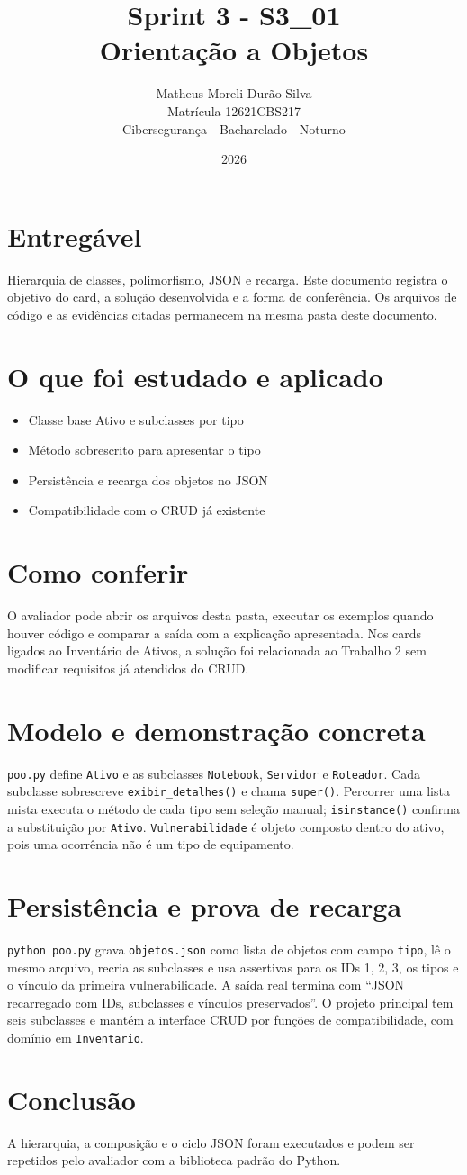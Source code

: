 \documentclass[12pt]{article}
\title{Sprint 3 - S3\_01\\Orientação a Objetos}
\author{Matheus Moreli Durão Silva\\Matrícula 12621CBS217\\Cibersegurança - Bacharelado - Noturno}
\date{2026}
\begin{document}
\maketitle

\section*{Entregável}
Hierarquia de classes, polimorfismo, JSON e recarga. Este documento registra o objetivo do card, a solução desenvolvida e a forma de conferência. Os arquivos de código e as evidências citadas permanecem na mesma pasta deste documento.

\section*{O que foi estudado e aplicado}
\begin{itemize}
\item Classe base Ativo e subclasses por tipo
\item Método sobrescrito para apresentar o tipo
\item Persistência e recarga dos objetos no JSON
\item Compatibilidade com o CRUD já existente
\end{itemize}

\section*{Como conferir}
O avaliador pode abrir os arquivos desta pasta, executar os exemplos quando houver código e comparar a saída com a explicação apresentada. Nos cards ligados ao Inventário de Ativos, a solução foi relacionada ao Trabalho 2 sem modificar requisitos já atendidos do CRUD.

\section*{Modelo e demonstração concreta}
\texttt{poo.py} define \texttt{Ativo} e as subclasses \texttt{Notebook}, \texttt{Servidor} e \texttt{Roteador}. Cada subclasse sobrescreve \texttt{exibir\_detalhes()} e chama \texttt{super()}. Percorrer uma lista mista executa o método de cada tipo sem seleção manual; \texttt{isinstance()} confirma a substituição por \texttt{Ativo}. \texttt{Vulnerabilidade} é objeto composto dentro do ativo, pois uma ocorrência não é um tipo de equipamento.
\section*{Persistência e prova de recarga}
\texttt{python poo.py} grava \texttt{objetos.json} como lista de objetos com campo \texttt{tipo}, lê o mesmo arquivo, recria as subclasses e usa assertivas para os IDs 1, 2, 3, os tipos e o vínculo da primeira vulnerabilidade. A saída real termina com ``JSON recarregado com IDs, subclasses e vínculos preservados''. O projeto principal tem seis subclasses e mantém a interface CRUD por funções de compatibilidade, com domínio em \texttt{Inventario}.
\section*{Conclusão}
A hierarquia, a composição e o ciclo JSON foram executados e podem ser repetidos pelo avaliador com a biblioteca padrão do Python.
\end{document}
